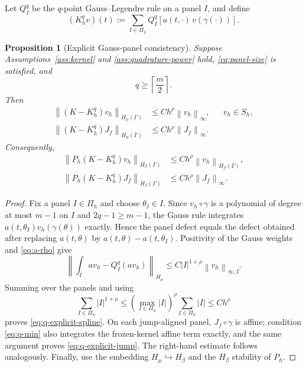 \documentclass[11pt,a4paper]{amsart}
\theoremstyle{plain}
\newtheorem{proposition}[theorem]{Proposition}
\theoremstyle{definition}
\theoremstyle{remark}
\newcommand{\Ga}{\Gamma}
\newcommand{\norm}[1]{\left\|#1\right\|}
\begin{document}
Let $Q_I^q$ be the $q$-point Gauss--Legendre rule on a panel $I$, and define
\begin{equation}\label{eq:Khq}
        (K_h^qv)(t)
        :=
        \sum_{I\in\Pi_h}
        Q_I^q\!\left[
        a(t,\cdot)\,v(\gamma(\cdot))
        \right].
\end{equation}

\begin{proposition}[Explicit Gauss-panel consistency]
\label{prop:explicit-quadrature}
Suppose Assumptions~\ref{ass:kernel} and
\ref{ass:quadrature-power} hold, \eqref{eq:panel-size} is satisfied, and
\begin{equation}\label{eq:q-min}
        q\ge\left\lceil\frac m2\right\rceil.
\end{equation}
Then
\begin{align}
 \norm{(K-K_h^q)v_h}_{H_\mu(\Ga)}
 &\le
 Ch^\rho\norm{v_h}_{\infty},
 &&v_h\in S_h,\label{eq:q-explicit-spline}\\
 \norm{(K-K_h^q)J_f}_{H_\mu(\Ga)}
 &\le
 Ch^\rho\norm{J_f}_{\infty}.\label{eq:q-explicit-jump}
\end{align}
Consequently,
\begin{align}
 \norm{P_h(K-K_h^q)v_h}_{H_\beta(\Ga)}
 &\le
 Ch^\rho\norm{v_h}_{H_\beta(\Ga)},\label{eq:qop-explicit}\\
 \norm{P_h(K-K_h^q)J_f}_{H_\beta(\Ga)}
 &\le
 Ch^\rho\norm{J_f}_{\infty}.\label{eq:qrhs-explicit}
\end{align}
\end{proposition}

\begin{proof}
Fix a panel $I\in\Pi_h$ and choose $\theta_I\in I$.  Since
$v_h\circ\gamma$ is a polynomial of degree at most $m-1$ on $I$ and
$2q-1\ge m-1$, the Gauss rule integrates
$a(t,\theta_I)v_h(\gamma(\theta))$ exactly.  Hence the panel defect equals
the defect obtained after replacing $a(t,\theta)$ by
$a(t,\theta)-a(t,\theta_I)$.  Positivity of the Gauss weights and
\eqref{eq:a-rho} give
\[
 \left\|
 \int_I av_h-Q_I^q(av_h)
 \right\|_{H_\mu}
 \le
 C|I|^{1+\rho}\norm{v_h}_{\infty,I}.
\]
Summing over the panels and using
\[
        \sum_{I\in\Pi_h}|I|^{1+\rho}
        \le
        \left(\max_{I\in\Pi_h}|I|\right)^\rho
        \sum_{I\in\Pi_h}|I|
        \le Ch^\rho
\]
proves \eqref{eq:q-explicit-spline}.  On each jump-aligned panel,
$J_f\circ\gamma$ is affine; condition \eqref{eq:q-min} also integrates the
frozen-kernel affine term exactly, and the same argument proves
\eqref{eq:q-explicit-jump}.  The right-hand estimate follows analogously.  Finally, use the embedding $H_\mu\hookrightarrow H_\beta$ and the $H_\beta$ stability of $P_h$.
\end{proof}
\end{document}
